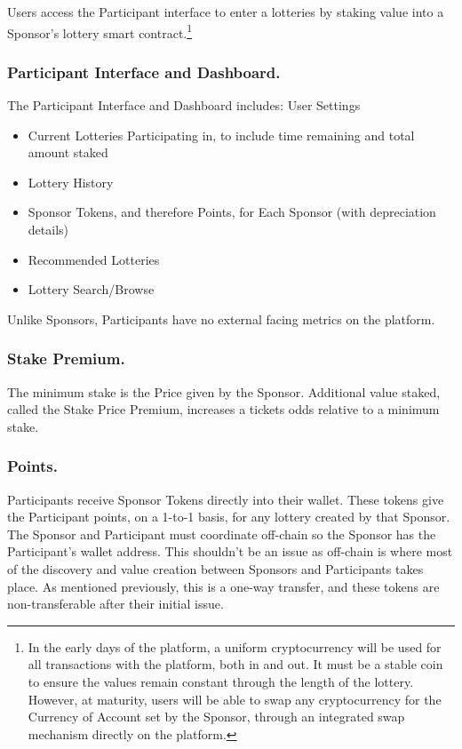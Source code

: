\documentclass[runningheads]{llncs}
\begin{document}
Users access the Participant interface to enter a lotteries by staking value into a Sponsor’s lottery smart contract.\footnote{In the early days of the platform, a uniform cryptocurrency will be used for all transactions with the platform, both in and out.  It must be a stable coin to ensure the values remain constant through the length of the lottery.  However, at maturity, users will be able to swap any cryptocurrency for the Currency of Account set by the Sponsor, through an integrated swap mechanism directly on the platform.}

\subsubsection{Participant Interface and Dashboard.}  The Participant Interface and Dashboard includes:
User Settings
\begin{itemize}
\item Current Lotteries Participating in, to include time remaining and total amount staked
\item Lottery History 
\item Sponsor Tokens, and therefore Points, for Each Sponsor (with depreciation details)
\item Recommended Lotteries
\item Lottery Search/Browse
\end{itemize}
Unlike Sponsors, Participants have no external facing metrics on the platform.

\subsubsection{Stake Premium.} The minimum stake is the Price given by the Sponsor.  Additional value staked, called the Stake Price Premium, increases a tickets odds relative to a minimum stake.

\subsubsection{Points.}  Participants receive Sponsor Tokens directly into their wallet.  These tokens give the Participant points, on a 1-to-1 basis, for any lottery created by that Sponsor.  The Sponsor and Participant must coordinate off-chain so the Sponsor has the Participant’s wallet address.  This shouldn’t be an issue as off-chain is where most of the discovery and value creation between Sponsors and Participants takes place.  As mentioned previously, this is a one-way transfer, and these tokens are non-transferable after their initial issue.
\end{document}
